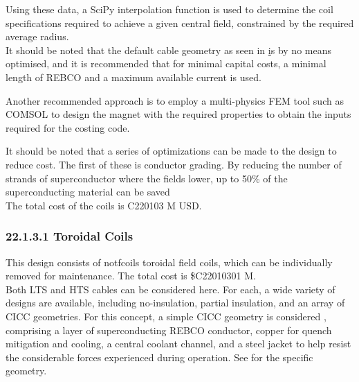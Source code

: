 Using these data, a SciPy interpolation function is used to determine the coil specifications required to achieve a given central field, constrained by the required average radius.\\

It should be noted that the default cable geometry as seen in \href{fig:yuhu_cs} is by no means optimised, and it is recommended that for minimal capital costs, a minimal length of REBCO and a maximum available current is used.



Another recommended approach is to employ a multi-physics FEM tool such as COMSOL to design the magnet with the required properties to obtain the inputs required for the costing code.

It should be noted that a series of optimizations can be made to the design to reduce cost. The first of these is conductor grading. By reducing the number of strands of superconductor where the fields lower, up to 50\% of the superconducting material can be saved
\\

The total cost of the coils is C220103 M USD.


\subsubsection*{22.1.3.1 Toroidal Coils}

This design consists of notfcoils toroidal field coils, which can be individually removed for maintenance. The total cost is \$C22010301 M.\\

Both LTS and HTS cables can be considered here. For each, a wide variety of designs are available, including no-insulation, partial insulation, and an array of CICC geometries. For this concept, a simple CICC geometry is considered
, comprising a layer of superconducting REBCO conductor, copper for quench mitigation and cooling, a central coolant channel, and a steel jacket to help resist the considerable forces experienced during operation. See
for the specific geometry.\\

